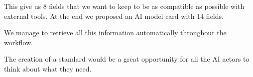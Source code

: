 This give us 8 fields that we want to keep to be as compatible as possible with
external tools. At the end we proposed an AI model card with 14 fields.


We manage to retrieve all this information automatically throughout the workflow.

The creation of a standard
would be a great opportunity for all the AI actors to think about what they
need.


%
%
%



